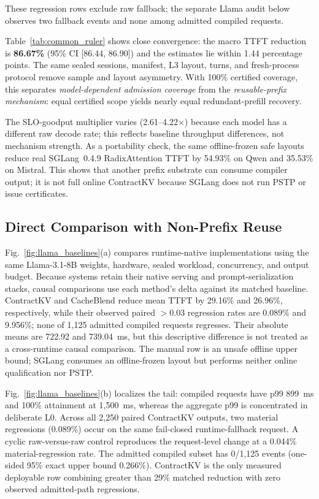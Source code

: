 \documentclass[journal]{IEEEtran}
\begin{document}
These regression rows exclude raw fallback; the separate Llama audit below observes two fallback events and none among admitted compiled requests.

Table~\ref{tab:common_ruler} shows close convergence: the macro TTFT reduction is \textbf{86.67\%} (95\% CI [86.44, 86.90]) and the estimates lie within 1.44 percentage points. The same sealed sessions, manifest, L3 layout, turns, and fresh-process protocol remove sample and layout asymmetry. With 100\% certified coverage, this separates \emph{model-dependent admission coverage} from the \emph{reusable-prefix mechanism}: equal certified scope yields nearly equal redundant-prefill recovery.

The SLO-goodput multiplier varies (2.61--4.22$\times$) because each model has a different raw decode rate; this reflects baseline throughput differences, not mechanism strength. As a portability check, the same offline-frozen safe layouts reduce real SGLang~0.4.9 RadixAttention TTFT by 54.93\% on Qwen and 35.53\% on Mistral. This shows that another prefix substrate can consume compiler output; it is not full online ContractKV because SGLang does not run PSTP or issue certificates.

\subsection{Direct Comparison with Non-Prefix Reuse}
\label{sec:llama_baselines}

Fig.~\ref{fig:llama_baselines}(a) compares runtime-native implementations using the same Llama-3.1-8B weights, hardware, sealed workload, concurrency, and output budget. Because systems retain their native serving and prompt-serialization stacks, causal comparisons use each method's delta against its matched baseline. ContractKV and CacheBlend reduce mean TTFT by 29.16\% and 26.96\%, respectively, while their observed paired $>0.03$ regression rates are 0.089\% and 9.956\%; none of 1{,}125 admitted compiled requests regresses. Their absolute means are 722.92 and 739.04~ms, but this descriptive difference is not treated as a cross-runtime causal comparison. The manual row is an unsafe offline upper bound; SGLang consumes an offline-frozen layout but performs neither online qualification nor PSTP.

Fig.~\ref{fig:llama_baselines}(b) localizes the tail: compiled requests have p99 899~ms and 100\% attainment at 1{,}500~ms, whereas the aggregate p99 is concentrated in deliberate L0. Across all 2{,}250 paired ContractKV outputs, two material regressions (0.089\%) occur on the same fail-closed runtime-fallback request. A cyclic raw-versus-raw control reproduces the request-level change at a 0.044\% material-regression rate. The admitted compiled subset has 0/1{,}125 events (one-sided 95\% exact upper bound 0.266\%). ContractKV is the only measured deployable row combining greater than 29\% matched reduction with zero observed admitted-path regressions.
\end{document}
